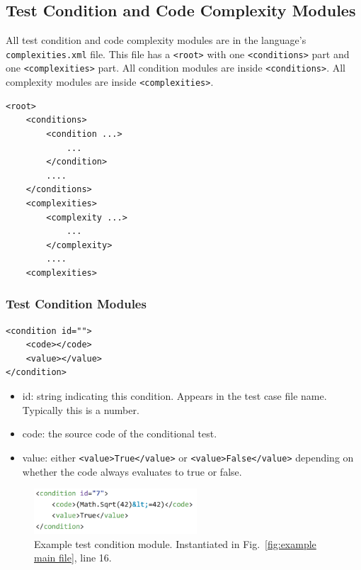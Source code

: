 \subsection{Test Condition and Code Complexity Modules}

All test condition and code complexity modules are in the 
language's \verb|complexities.xml| file.  This file has
a \verb|<root>| with one \verb|<conditions>| part and one
\verb|<complexities>| part.
All condition modules are inside \verb|<conditions>|.  All
complexity modules are inside \verb|<complexities>|.

\begin{verbatim}
<root>
    <conditions>
        <condition ...>
            ...
        </condition>
        ....
    </conditions>
    <complexities>
        <complexity ...>
            ...
        </complexity>
        ....
    <complexities>
\end{verbatim}

\subsubsection{Test Condition Modules}
\label{sec: condition modules}

\begin{verbatim}
<condition id="">
    <code></code>
    <value></value>
</condition>
\end{verbatim}

\begin{itemize}
    \item id: string indicating this condition.  Appears in the test case
      file name.  Typically this is a number.

    \item code: the source code of the conditional test.

    \item value: either \verb|<value>True</value>| or
        \verb|<value>False</value>| depending on \\
        whether the code always evaluates to true or false.
\end{itemize}

\begin{figure}[htbp]
  \includegraphics[width=2.4in]{fig_Complexity_file_test.png}
  \caption{Example test condition module.  Instantiated in
    Fig.~\ref{fig:example main file}, line 16.}
  \label{fig:example complexity-test file}
\end{figure}


